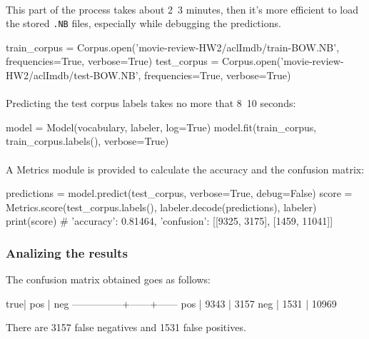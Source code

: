 \documentclass{article}
\begin{document}
\paragraph{} This part of the process takes about 2~3 minutes, then it's more efficient to load the stored \texttt{.NB} files, especially while debugging the predictions.

\begin{python}
train_corpus = Corpus.open('movie-review-HW2/aclImdb/train-BOW.NB', frequencies=True, verbose=True)
test_corpus = Corpus.open('movie-review-HW2/aclImdb/test-BOW.NB', frequencies=True, verbose=True)
\end{python}

\paragraph{} Predicting the test corpus labels takes no more that 8~10 seconds:

\begin{python}
model = Model(vocabulary, labeler, log=True)
model.fit(train_corpus, train_corpus.labels(), verbose=True)
\end{python}

\paragraph{} A Metrics module is provided to calculate the accuracy and the confusion matrix:

\begin{python}
predictions = model.predict(test_corpus, verbose=True, debug=False)
score = Metrics.score(test_corpus.labels(), labeler.decode(predictions), labeler)
print(score)
# {'accuracy': 0.81464, 'confusion': [[9325, 3175], [1459, 11041]]}
\end{python}

\subsubsection*{Analizing the results}

The confusion matrix obtained goes as follows:

\begin{python}
true\predicted |  pos |   neg
---------------+------+------
           pos | 9343 |  3157
           neg | 1531 | 10969
\end{python}

There are 3157 false negatives and 1531 false positives.
\end{document}
